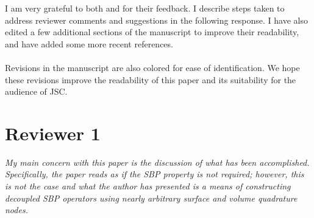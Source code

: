 \documentclass{article}
\newcommand{\bnote}[1]{{\color{blue}{#1}}}
\newcommand{\rnote}[1]{{\color{red}{#1}}}
\begin{document}

I am very grateful to both \bnote{Reviewer 1} and \rnote{Reviewer 2} for their feedback.  I describe steps taken to address reviewer comments and suggestions in the following response.  I have also edited a few additional sections of the manuscript to improve their readability, and have added some more recent references.
\\
\\
Revisions in the manuscript are also colored for ease of identification.  We hope these revisions improve the readability of this paper and its suitability for the audience of JSC.

\section{Reviewer 1}

\textit{My main concern with this paper is the discussion of what has been accomplished. Specifically, the paper reads as if the SBP property is not required; however, this is not the case and what the author has presented is a means of constructing decoupled SBP operators using nearly arbitrary surface and volume quadrature nodes. }

\bnote{I wholeheartedly agree with Reviewer 1's assessment of the structure of the paper, and thank them for bringing this to my attention.  I have restructured the paper to make this more clear, and have added references to make connections to similar approaches in the SBP literature.  The main restructuring shows how to construct the SBP operator, and utilizes the ``variational'' SBP property only to prove accuracy properties.  The paper is also shorter and more concise after these revisions.}
\end{document}
